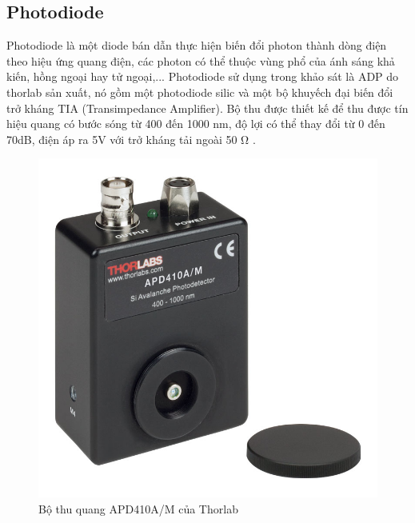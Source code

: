 \subsection{Photodiode}
Photodiode là một diode bán dẫn thực hiện biến đổi photon thành dòng điện theo hiệu ứng quang điện, các photon có thể thuộc vùng phổ của ánh sáng khả kiến, hồng ngoại hay tử ngoại,... Photodiode sử dụng trong khảo sát là ADP do thorlab sản xuất, nó gồm một photodiode silic và một bộ khuyếch đại biến đổi trở kháng TIA (Transimpedance Amplifier). Bộ thu được thiết kế để thu được tín hiệu quang có bước sóng từ 400 đến 1000 nm, độ lợi có thể thay đổi từ 0 đến 70dB, điện áp ra 5V với trở kháng tải ngoài 50 Ω .
\begin{figure} [ht]
	\centering
	\captionsetup{justification=centering}
	\includegraphics [scale=0.3] {Image/APD410A_M}
	\caption{Bộ thu quang APD410A/M của Thorlab}
\end{figure}

